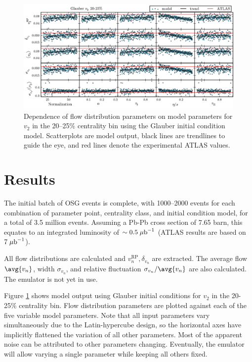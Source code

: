 \documentclass[reprint,amsmath]{revtex4-1}
\begin{document}
\begin{figure}[t]
  \centering
  \includegraphics{scatters}
  \caption{Dependence of flow distribution parameters on model parameters for $v_2$ in the 20--25\% centrality bin using the Glauber initial
  condition model.  Scatterplots are model output, black lines are trendlines to guide the eye, and red lines denote the
  experimental ATLAS values.}
  \label{fig:scatters}
\end{figure}

\section{Results}

The initial batch of OSG events is complete, with 1000--2000 events for each combination of parameter point, centrality class, and
initial condition model, for a total of 3.5 million events.  Assuming a Pb-Pb cross section of 7.65 barn, this equates to an integrated
luminosity of $\sim 0.5 \; \mu\text b^{-1}$ (ATLAS results are based on $7 \; \mu\text b^{-1}$).

All flow distributions are calculated and $v_n^\text{RP},\delta_{v_n}$ are extracted.  The average flow $\avg{v_n}$, width $\sigma_{v_n}$, and relative fluctuation
$\sigma_{v_n}/\avg{v_n}$ are also calculated.  The emulator is not yet in use.

Figure \ref{fig:scatters} shows model output using Glauber initial conditions for $v_2$ in the 20-25\% centrality bin.  Flow distribution
parameters are plotted against each of the five variable model parameters.  Note that all input parameters vary simultaneously due to the
Latin-hypercube design, so the horizontal axes have implicitly flattened the variation of all other parameters.  Most of the apparent noise
can be attributed to other parameters changing.  Eventually, the emulator will allow varying a single parameter while keeping all others
fixed.
\end{document}
